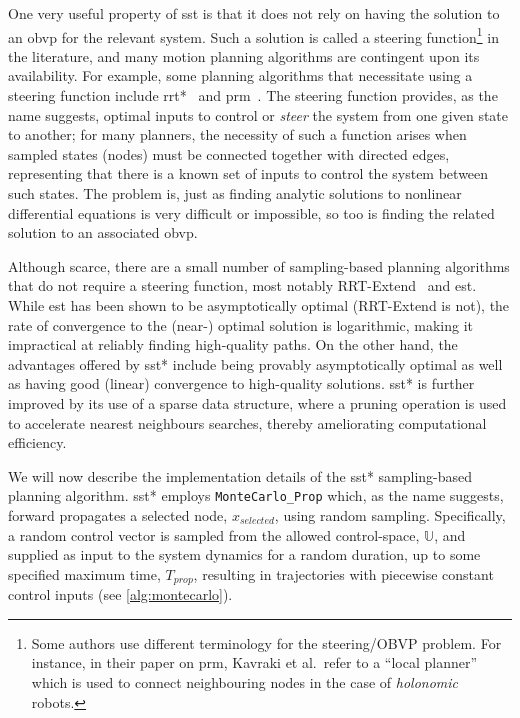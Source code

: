 One very useful property of \gls{sst} is that it does not rely on having the solution to an \gls{obvp} for the relevant system. Such a solution is called a steering function\footnote{Some authors use different terminology for the steering/OBVP problem. For instance, in their paper on \gls{prm}, Kavraki et al.\ refer to a ``local planner'' which is used to connect neighbouring nodes in the case of \emph{holonomic} robots.} in the literature, and many motion planning algorithms are contingent upon its availability. For example, some planning algorithms that necessitate using a steering function include \gls{rrt}*~\cite{Karaman2011} and \gls{prm}~\cite{Kavraki1996}. The steering function provides, as the name suggests, optimal inputs to control or \emph{steer} the system from one given state to another; for many planners, the necessity of such a function arises when sampled states (nodes) must be connected together with directed edges, representing that there is a known set of inputs to control the system between such states. The problem is, just as finding analytic solutions to nonlinear differential equations is very difficult or impossible, so too is finding the related solution to an associated \gls{obvp}\@.

Although scarce, there are a small number of sampling-based planning algorithms that do not require a steering function, most notably RRT-Extend~\cite{LaValle2001} and \gls{est}. While \gls{est} has been shown to be asymptotically optimal (RRT-Extend is not), the rate of convergence to the (near-) optimal solution is logarithmic, making it impractical at reliably finding high-quality paths. On the other hand, the advantages offered by \gls{sst}* include being provably asymptotically optimal as well as having good (linear) convergence to high-quality solutions. \gls{sst}* is further improved by its use of a sparse data structure, where a pruning operation is used to accelerate nearest neighbours searches, thereby ameliorating computational efficiency.

We will now describe the implementation details of the \gls{sst}* sampling-based planning algorithm. \gls{sst}* employs \texttt{MonteCarlo\_Prop} which, as the name suggests, forward propagates a selected node, $x_{selected}$, using random sampling. Specifically, a random control vector is sampled from the allowed control-space, $\mathbb{U}$, and supplied as input to the system dynamics for a random duration, up to some specified maximum time, $T_{prop}$, resulting in trajectories with piecewise constant control inputs (see \autoref{alg:montecarlo}).

